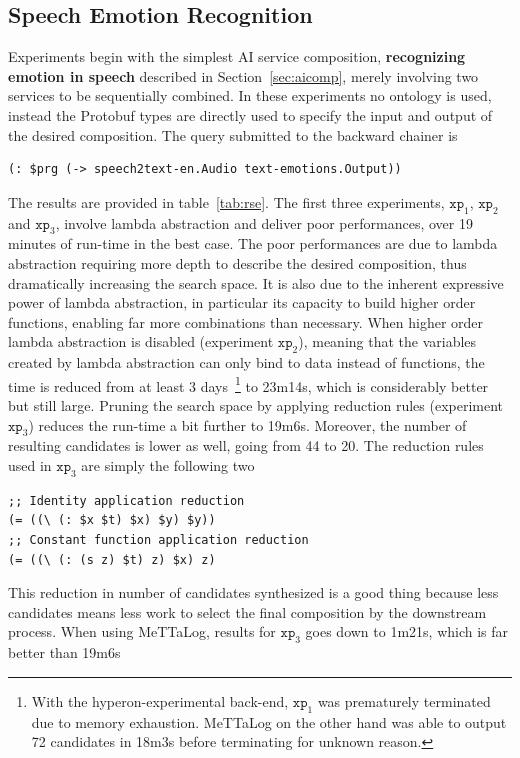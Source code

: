 \documentclass[]{report}
\begin{document}
\subsection{Speech Emotion Recognition}
Experiments begin with the simplest AI service composition,
\textbf{recognizing emotion in speech} described in
Section~\ref{sec:aicomp}, merely involving two services to be
sequentially combined.  In these experiments no ontology is used,
instead the Protobuf types are directly used to specify the input and
output of the desired composition.  The query submitted to the
backward chainer is
\begin{verbatim}
(: $prg (-> speech2text-en.Audio text-emotions.Output))
\end{verbatim}
The results are provided in table~\ref{tab:rse}.  The first three
experiments, $\texttt{xp}_1$, $\texttt{xp}_2$ and $\texttt{xp}_3$,
involve lambda abstraction and deliver poor performances, over 19
minutes of run-time in the best case.  The poor performances are due
to lambda abstraction requiring more depth to describe the desired
composition, thus dramatically increasing the search space.  It is
also due to the inherent expressive power of lambda abstraction, in
particular its capacity to build higher order functions, enabling far
more combinations than necessary.  When higher order lambda
abstraction is disabled (experiment $\texttt{xp}_2$), meaning that the
variables created by lambda abstraction can only bind to data instead
of functions, the time is reduced from at least 3 days~\footnote{With
the hyperon-experimental back-end, $\texttt{xp}_1$ was prematurely
terminated due to memory exhaustion.  MeTTaLog on the other hand was
able to output 72 candidates in 18m3s before terminating for unknown
reason.} to 23m14s, which is considerably better but still large.
Pruning the search space by applying reduction rules (experiment
$\texttt{xp}_3$) reduces the run-time a bit further to 19m6s.
Moreover, the number of resulting candidates is lower as well, going
from 44 to 20.  The reduction rules used in $\texttt{xp}_3$ are simply
the following two
\begin{verbatim}
;; Identity application reduction
(= ((\ (: $x $t) $x) $y) $y))
;; Constant function application reduction
(= ((\ (: (s z) $t) z) $x) z)
\end{verbatim}
This reduction in number of candidates synthesized is a good thing
because less candidates means less work to select the final
composition by the downstream process.  When using MeTTaLog, results
for $\texttt{xp}_3$ goes down to 1m21s, which is far better than 19m6s
\end{document}
